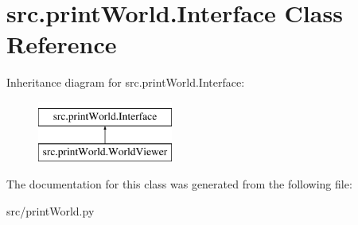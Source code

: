 \hypertarget{classsrc_1_1print_world_1_1_interface}{}\section{src.\+print\+World.\+Interface Class Reference}
\label{classsrc_1_1print_world_1_1_interface}
Inheritance diagram for src.\+print\+World.\+Interface\+:\begin{figure}[H]
\begin{center}
\leavevmode
\includegraphics[height=2.000000cm]{classsrc_1_1print_world_1_1_interface}
\end{center}
\end{figure}


The documentation for this class was generated from the following file\+:\begin{DoxyCompactItemize}
\item 
src/print\+World.\+py\end{DoxyCompactItemize}
